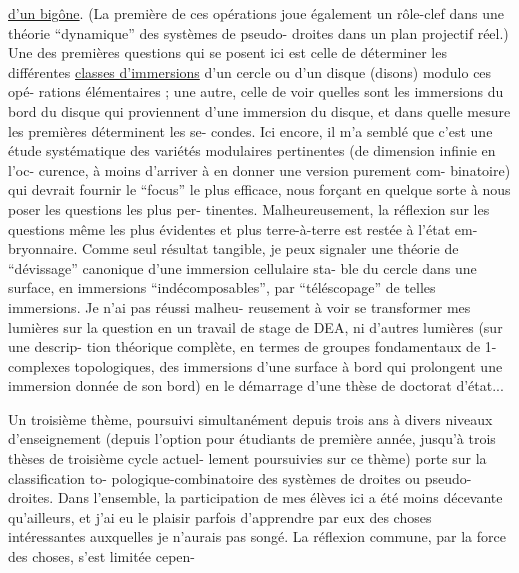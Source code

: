 
\uline{d'un bigône}. (La première de ces opérations joue également un
rôle-clef dans une théorie ``dynamique'' des systèmes de pseudo-%
droites dans un plan projectif réel.) Une des premières questions
qui se posent ici est celle de déterminer les différentes \uline{classes
d'immersions} d'un cercle ou d'un disque (disons) modulo ces opé-%
rations élémentaires ; une autre, celle de voir quelles sont les
immersions du bord du disque qui proviennent d'une immersion du
disque, et dans quelle mesure les premières déterminent les se-%
condes. Ici encore, il m'a semblé que c'est une étude systématique
des variétés modulaires pertinentes (de dimension infinie en l'oc-%
curence, à moins d'arriver à en donner une version purement com-%
binatoire) qui devrait fournir le ``focus'' le plus efficace, nous
forçant en quelque sorte à nous poser les questions les plus per-%
tinentes. Malheureusement, la réflexion sur les questions même
les plus évidentes et  plus terre-à-terre est restée à l'état em-%
bryonnaire. Comme seul résultat tangible, je peux signaler une
théorie de ``dévissage'' canonique d'une immersion cellulaire sta-%
ble du cercle dans une surface, en immersions ``indécomposables'',
par ``téléscopage'' de telles immersions. Je n'ai pas réussi malheu-%
reusement à voir se transformer mes lumières sur la question en
un travail de stage de DEA, ni d'autres lumières (sur une descrip-%
tion théorique complète, en termes de groupes fondamentaux de
1-complexes topologiques, des immersions d'une surface à bord qui
prolongent une immersion donnée de son bord) en le démarrage d'une
thèse de doctorat d'état...

Un troisième thème, poursuivi simultanément depuis trois
ans à divers niveaux d'enseignement (depuis l'option pour étudiants
de première année, jusqu'à trois thèses de troisième cycle actuel-%
lement poursuivies sur ce thème) porte sur la classification to-%
pologique-combinatoire des systèmes de droites ou pseudo-droites.
Dans l'ensemble, la participation de mes élèves ici a été moins
décevante qu'ailleurs, et j'ai eu le plaisir parfois d'apprendre
par eux des choses intéressantes auxquelles je n'aurais pas songé.
La réflexion commune, par la force des choses, s'est limitée cepen-%

